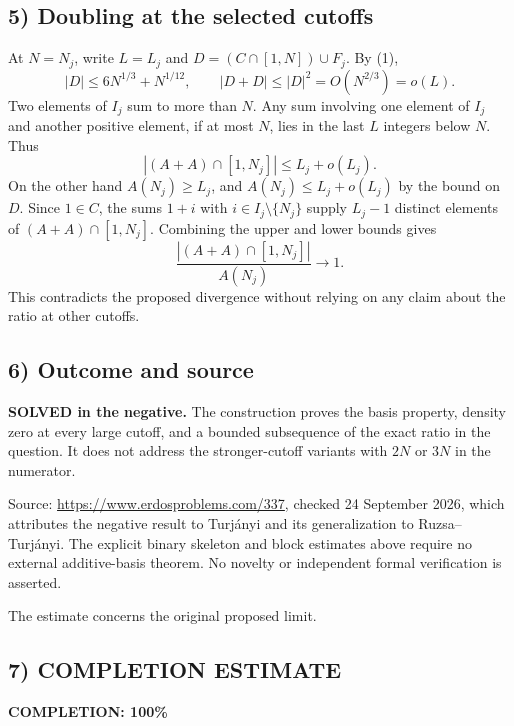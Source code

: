 \subsection*{5) Doubling at the selected cutoffs}
At $N=N_j$, write $L=L_j$ and $D=(C\cap[1,N])\cup F_j$. By (1),
\[|D|\le6N^{1/3}+N^{1/12},\qquad |D+D|\le|D|^2=O(N^{2/3})=o(L).
\]
Two elements of $I_j$ sum to more than $N$. Any sum involving one element of $I_j$ and another positive element, if at most $N$, lies in the last $L$ integers below $N$. Thus
\[|(A+A)\cap[1,N_j]|\le L_j+o(L_j).
\]
On the other hand $A(N_j)\ge L_j$, and $A(N_j)\le L_j+o(L_j)$ by the bound on $D$. Since $1\in C$, the sums $1+i$ with $i\in I_j\setminus\{N_j\}$ supply $L_j-1$ distinct elements of $(A+A)\cap[1,N_j]$. Combining the upper and lower bounds gives
\[\frac{|(A+A)\cap[1,N_j]|}{A(N_j)}\longrightarrow1.
\]
This contradicts the proposed divergence without relying on any claim about the ratio at other cutoffs.

\subsection*{6) Outcome and source}
\textbf{SOLVED in the negative.} The construction proves the basis property, density zero at every large cutoff, and a bounded subsequence of the exact ratio in the question. It does not address the stronger-cutoff variants with $2N$ or $3N$ in the numerator.

Source: \url{https://www.erdosproblems.com/337}, checked 24 September 2026, which attributes the negative result to Turj\'anyi and its generalization to Ruzsa--Turj\'anyi. The explicit binary skeleton and block estimates above require no external additive-basis theorem. No novelty or independent formal verification is asserted.

The estimate concerns the original proposed limit.
\subsection*{7) COMPLETION ESTIMATE}
\textbf{COMPLETION: 100\%}
